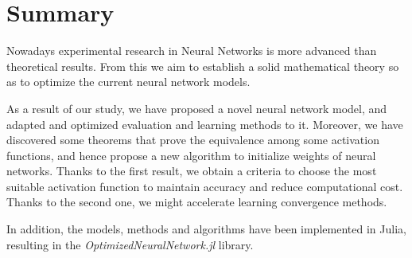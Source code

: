 %

\chapter*{Summary}\label{ch:summary}

Nowadays experimental research in Neural Networks is more advanced than theoretical
results. 
From this we aim to establish a solid mathematical theory so as to optimize the current neural network models. 


As a result of our study, we have proposed a novel neural 
network model, and adapted and optimized
evaluation and learning methods to it. 
Moreover, we have discovered some theorems that prove the 
equivalence among some activation functions, and hence propose a new
 algorithm to initialize weights of neural networks. Thanks to the
first result, we obtain a criteria to choose the most 
suitable activation function to maintain accuracy and reduce computational cost.
 Thanks to the second one, we might accelerate 
learning convergence methods.

In addition, the models, methods and algorithms have been 
implemented in Julia, resulting in the \textit{OptimizedNeuralNetwork.jl} library. 


